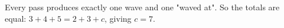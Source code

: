 Every pass produces exactly one wave and one "waved at". So the totals are equal: $3+4+5=2+3+c$, giving $c=\boxed{7}$.
